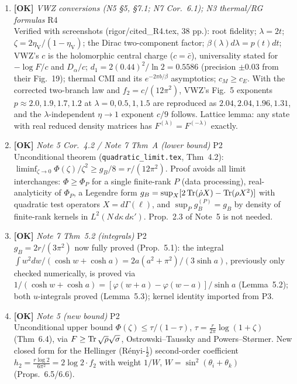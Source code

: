 \documentclass[11pt]{article}
\begin{document}
\begin{enumerate}[leftmargin=1.6em,itemsep=6pt]
\item \textbf{[OK]} \emph{VWZ conversions (N5 \S5, \S7.1; N7 Cor.~6.1); N3 thermal/RG formulas} \hfill\textsc{R4}\\ Verified with screenshots (rigor/cited\_R4.tex, 38 pp.): root fidelity; \(\lambda=2t\); \(\zeta=2\eta_{\mathrm V}/(1-\eta_{\mathrm V})\); the Dirac two-component factor; \(\beta(\lambda)d\lambda=p(t)dt\); VWZ's \(c\) is the holomorphic central charge (\(c=\bar c\)), universality stated for \(-\log F/c\) and \(D_\alpha/c\); \(d_1=2(0.44)^2/\ln2=0.5586\) (precision \(\pm0.03\) from their Fig.~19); thermal CMI and its \(e^{-2\pi b/\beta}\) asymptotics; \(c_M\ge c_E\). With the corrected two-branch law and \(f_2=c/(12\pi^2)\), VWZ's Fig.~5 exponents \(p\approx2.0,1.9,1.7,1.2\) at \(\lambda=0,0.5,1,1.5\) are reproduced as \(2.04,2.04,1.96,1.31\), and the \(\lambda\)-independent \(\eta\to1\) exponent \(c/9\) follows. Lattice lemma: any state with real reduced density matrices has \(F^{(\lambda)}=F^{(-\lambda)}\) exactly.
\item \textbf{[OK]} \emph{Note 5 Cor.~4.2 / Note 7 Thm~A (lower bound)} \hfill\textsc{P2}\\ Unconditional theorem (\texttt{quadratic\_limit.tex}, Thm~4.2): \(\liminf_{\zeta\to0}\Phi(\zeta)/\zeta^2\ge g_B/8=r/(12\pi^2)\). Proof avoids all limit interchanges: \(\Phi\ge\Phi_P\) for a single finite-rank \(P\) (data processing), real-analyticity of \(\Phi_P\), a Legendre form \(g_B=\sup_X[2\operatorname{Tr}(\dot\rho X)-\operatorname{Tr}(\rho X^2)]\) with quadratic test operators \(X=d\Gamma(\ell)\), and \(\sup_Pg_B^{(P)}=g_B\) by density of finite-rank kernels in \(L^2(N\,d\kappa\,d\kappa')\). Prop.~2.3 of Note~5 is not needed.
\item \textbf{[OK]} \emph{Note 7 Thm~5.2 (integrals)} \hfill\textsc{P2}\\ \(g_B=2r/(3\pi^2)\) now fully proved (Prop.~5.1): the integral \(\int w^2dw/(\cosh w+\cosh a)=2a(a^2+\pi^2)/(3\sinh a)\), previously only checked numerically, is proved via \(1/(\cosh w+\cosh a)=[\varphi(w+a)-\varphi(w-a)]/\sinh a\) (Lemma~5.2); both \(u\)-integrals proved (Lemma~5.3); kernel identity imported from P3.
\item \textbf{[OK]} \emph{Note 5 (new bound)} \hfill\textsc{P2}\\ Unconditional upper bound \(\Phi(\zeta)\le\tau/(1-\tau)\), \(\tau=\frac r{2\pi}\log(1+\zeta)\) (Thm~6.4), via \(F\ge\operatorname{Tr}\sqrt\rho\sqrt\sigma\), Ostrowski--Taussky and Powers--St\o rmer. New closed form for the Hellinger (R\'enyi-\(\frac12\)) second-order coefficient \(h_2=\frac{r\log2}{6\pi^2}=2\log2\cdot f_2\) with weight \(1/W\), \(W=\sin^2(\theta_i+\theta_k)\) (Props.~6.5/6.6).

\end{enumerate}
\end{document}
